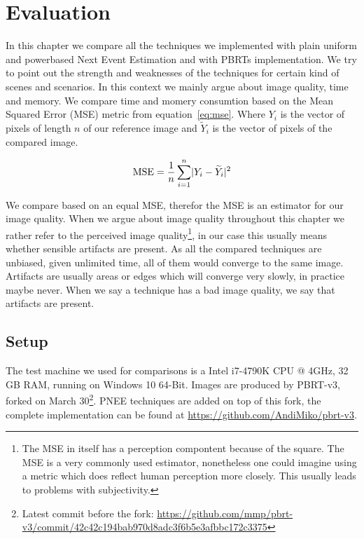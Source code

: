 \chapter{Evaluation}
\label{ch:Evaluation}
In this chapter we compare all the techniques we implemented with plain uniform and powerbased Next Event Estimation and with PBRTs implementation. We try to point out the strength and weaknesses of the techniques for certain kind of scenes and scenarios. In this context we mainly argue about image quality, time and memory. We compare time and momery consumtion based on the Mean Squared Error (MSE) metric from equation~\ref{eq:mse}. Where $Y_i$ is the vector of pixels of length $n$ of our reference image and $\widetilde{Y}_i$ is the vector of pixels of the compared image. 

\begin{align}\label{eq:mse}
\text{MSE} = \frac{1}{n}\sum_{i=1}^{n}\lvert Y_i - \widetilde{Y}_i\rvert^2
\end{align}


We compare based on an equal MSE, therefor the MSE is an estimator for our image quality. When we argue about image quality throughout this chapter we rather refer to the perceived image quality\footnote{The MSE in itself has a perception compontent because of the square. The MSE is a very commonly used estimator, nonetheless one could imagine using a metric which does reflect human perception more closely. This usually leads to problems with subjectivity.}, in our case this usually means whether sensible artifacts are present. As all the compared techniques are unbiased, given unlimited time, all of them would converge to the same image. Artifacts are usually areas or edges which will converge very slowly, in practice maybe never. When we say a technique has a bad image quality, we say that artifacts are present. 

\section{Setup}

The test machine we used for comparisons is a Intel i7-4790K CPU @ 4GHz, 32 GB RAM, running on Windows 10 64-Bit. Images are produced by PBRT-v3, forked on March 30\footnote{Latest commit before the fork: \url{https://github.com/mmp/pbrt-v3/commit/42c42c194bab970d8adc3f6b5e3afbbc172c3375}}. PNEE techniques are added on top of this fork, the complete implementation can be found at \url{https://github.com/AndiMiko/pbrt-v3}.

